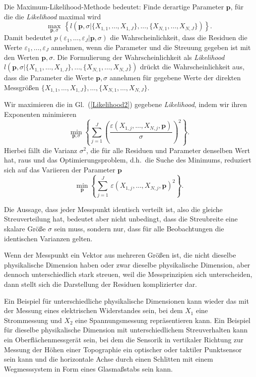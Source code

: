 Die Maximum-Likelihood-Methode bedeutet: Finde derartige Parameter $\mathbf{p}$, für die
die \textsl{Likelihood} maximal wird
\begin{equation}
\max_{\mathbf{p}, \sigma} \, \left\{ l(\mathbf{p}, \sigma | \{X_{1,1}, \dots, X_{1,J}\}, \dots, \{X_{N,1}, \dots, X_{N,J}\}) \right\}.
\end{equation}
Damit bedeutet $p(\varepsilon_1,\dots,\varepsilon_J | \mathbf{p}, \sigma)$ die Wahrscheinlichkeit,
dass die Residuen die Werte $\varepsilon_1,\dots,\varepsilon_J$ annehmen, wenn die Parameter und die Streuung gegeben ist
mit den Werten $\mathbf{p}, \sigma$. Die Formulierung der Wahrscheinlichkeit als \textsl{Likelihood}
$l(\mathbf{p}, \sigma | \{X_{1,1}, \dots, X_{1,J}\}, \dots, \{X_{N,1}, \dots, X_{N,J}\})$ drückt die
Wahrscheinlichkeit aus, dass die Parameter die Werte $\mathbf{p}, \sigma$ annehmen für gegebene Werte der
direkten Messgrößen $\{X_{1,1}, \dots, X_{1,J}\}, \dots, \{X_{N,1}, \dots, X_{N,J}\}$.

Wir maximieren die in Gl.~(\ref{Likelihood2}) gegebene \textsl{Likelihood}, indem wir
ihren Exponenten minimieren
\begin{equation}
\min_{\mathbf{p}, \sigma}\left\{ \sum\limits_{j = 1}^J \left(\frac{\varepsilon(X_{1,j},\dots,X_{N,j},\mathbf{p})}{\sigma}\right)^2  \right\}.
\end{equation}
Hierbei fällt die Varianz $\sigma^2$, die für alle Residuen und Parameter denselben Wert hat, raus und
das Optimierungsproblem, d.h.\ die Suche des Minimums, reduziert sich
auf das Variieren der Parameter $\mathbf{p}$
\begin{equation}
\min_{\mathbf{p}} \left\{ \sum\limits_{j = 1}^J \, \varepsilon(X_{1,j},\dots,X_{N,j},\mathbf{p})^2  \right\} .
\end{equation}

Die Aussage, dass jeder Messpunkt identisch verteilt ist, also die gleiche Streuverteilung hat,
bedeutet aber nicht unbedingt, dass die Streubreite eine skalare Größe $\sigma$ sein muss,
sondern nur, dass für alle Beobachtungen die identischen Varianzen gelten.


Wenn der Messpunkt ein Vektor aus mehreren Größen ist, die nicht
dieselbe physikalische Dimension haben oder zwar dieselbe physikalische Dimension, aber dennoch
unterschiedlich stark streuen, weil die Messprinzipien sich unterscheiden, dann stellt sich
die Darstellung der Residuen komplizierter dar.

Ein Beispiel für unterschiedliche physikalische
Dimensionen kann wieder das mit der Messung eines elektrischen Widerstandes sein, bei dem $X_1$ eine
Strommessung und $X_2$ eine Spannungsmessung repräsentieren kann.
Ein Beispiel für dieselbe physikalische Dimension mit unterschiedlichem Streuverhalten kann ein
Oberflächenmessgerät sein, bei dem die Sensorik in vertikaler Richtung zur Messung der Höhen einer
Topographie ein optischer oder taktiler Punktsensor sein kann und die horizontale Achse durch einen
Schlitten mit einem Wegmesssystem in Form eines Glasmaßstabs sein kann.

